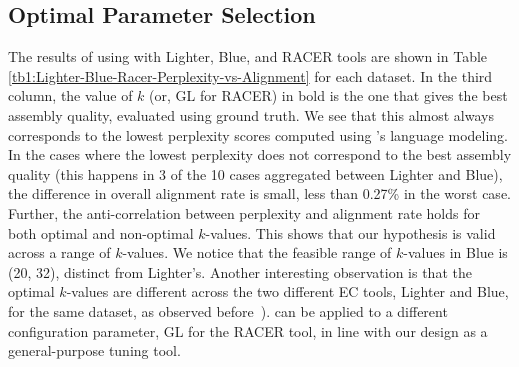 \vspace{-8pt}
\subsection{Optimal Parameter Selection}
\vspace{-8pt}
The results of using \name with Lighter, Blue, and RACER tools are shown in Table \ref{tb1:Lighter-Blue-Racer-Perplexity-vs-Alignment} for each dataset. In the third column, the value of $k$ (or, GL for RACER) in bold is the one that gives the best assembly quality, evaluated using ground truth.
We see that this almost always corresponds to the lowest perplexity scores computed using \name's language modeling. %
In the cases where the lowest perplexity does not correspond to the best assembly quality (this happens in 3 of the 10 cases aggregated between Lighter and Blue), the difference in overall alignment rate is small, less than 0.27\% in the worst case.  
Further, the anti-correlation between perplexity and alignment rate holds for both optimal and non-optimal $k$-values. 
This shows that our hypothesis is valid across a range of $k$-values. We notice that the feasible range of $k$-values in Blue is (20, 32), distinct from Lighter's. Another interesting observation is that the optimal $k$-values are different across the two different EC tools, Lighter and Blue, for the same dataset, as observed before~\cite{song2014lighter}). 
\name can be applied to a different configuration parameter, GL for the RACER tool, in line with our design as a general-purpose tuning tool.


